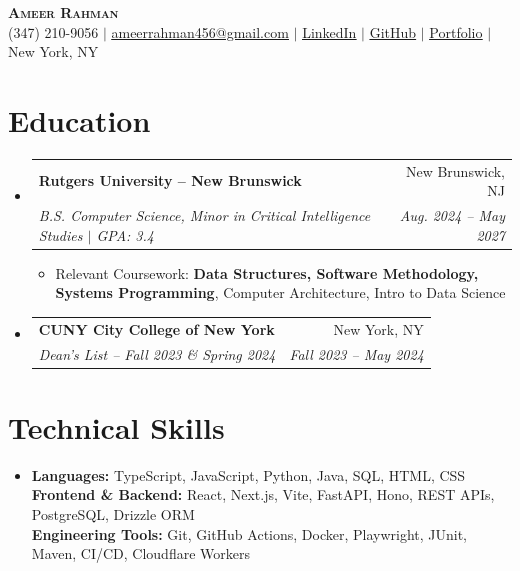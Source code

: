 \documentclass[letterpaper,10pt]{article}
\makeatletter
\newcommand{\resumeItem}[1]{\item\small{#1}}
\newcommand{\resumeSubheading}[4]{
  \vspace{1pt}\item
  \begin{tabular*}{0.97\textwidth}[t]{l@{\extracolsep{\fill}}r}
    \textbf{#1} & #2 \\
    \textit{\small #3} & \textit{\small #4} \\
  \end{tabular*}\vspace{-3pt}
}
\newcommand{\resumeSubHeadingListStart}{\begin{itemize}[leftmargin=0.15in,label={},itemsep=0pt,topsep=0pt]}
\newcommand{\resumeSubHeadingListEnd}{\end{itemize}}
\newcommand{\resumeItemListStart}{\begin{itemize}[leftmargin=0.15in,label=\textbullet,itemsep=-2pt,topsep=0pt]}
\newcommand{\resumeItemListEnd}{\end{itemize}\vspace{0pt}}
\makeatother
\begin{document}
\begin{center}
  {\Huge\scshape\textbf{Ameer Rahman}} \\ \vspace{2pt}
  \small (347) 210-9056 $|$
  \href{mailto:ameerrahman456@gmail.com}{\underline{ameerrahman456@gmail.com}} $|$
  \href{https://www.linkedin.com/in/ameer-rahman-a3bb232a0/}{\underline{LinkedIn}} $|$
  \href{https://github.com/ameer-rah}{\underline{GitHub}} $|$
  \href{https://ameer-rahman.info/}{\underline{Portfolio}} $|$ New York, NY
\end{center}

\section{Education}
\resumeSubHeadingListStart
  \resumeSubheading{Rutgers University -- New Brunswick}{New Brunswick, NJ}
    {B.S. Computer Science, Minor in Critical Intelligence Studies $|$ GPA: 3.4}{Aug. 2024 -- May 2027}
    \resumeItemListStart
      \resumeItem{Relevant Coursework: \textbf{Data Structures, Software Methodology, Systems Programming}, Computer Architecture, Intro to Data Science}
    \resumeItemListEnd
  \resumeSubheading{CUNY City College of New York}{New York, NY}
    {Dean's List -- Fall 2023 \& Spring 2024}{Fall 2023 -- May 2024}
\resumeSubHeadingListEnd

\section{Technical Skills}
\begin{itemize}[leftmargin=0.15in,label={},topsep=0pt]
  \small\item{
    \textbf{Languages:} TypeScript, JavaScript, Python, Java, SQL, HTML, CSS \\
    \textbf{Frontend \& Backend:} React, Next.js, Vite, FastAPI, Hono, REST APIs, PostgreSQL, Drizzle ORM \\
    \textbf{Engineering Tools:} Git, GitHub Actions, Docker, Playwright, JUnit, Maven, CI/CD, Cloudflare Workers
  }
\end{itemize}
\end{document}
